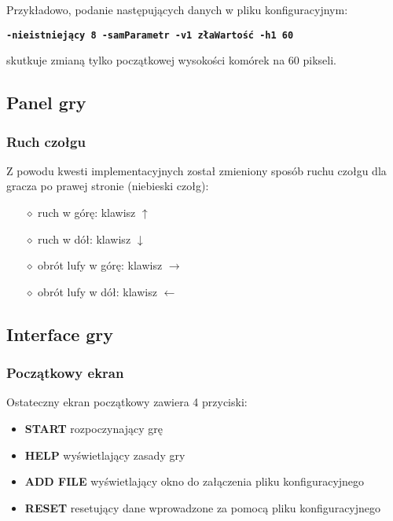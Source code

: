 \documentclass[a4paper]{article}
\begin{document}
Przyk\l{}adowo, podanie nast\k{e}puj\k{a}cych danych w pliku konfiguracyjnym:

\begin{center}
\texttt{\textbf{-nieistniej\k{a}cy 8 -samParametr -v1 z\l{}aWarto\'s\'c -h1 60}}    
\end{center}

skutkuje zmian\k{a} tylko pocz\k{a}tkowej wysoko\'sci kom\'orek na 60 pikseli.

\subsection{Panel gry}
\subsubsection{Ruch czo\l{}gu}
\quad Z powodu kwesti implementacyjnych zosta\l{} zmieniony spos\'ob ruchu czo\l{}gu dla gracza po prawej stronie (niebieski czo\l{}g):
\begin{itemize}
    \item[$\diamond$] ruch w g\'or\k{e}: klawisz \textbf{$\uparrow$}
    \item[$\diamond$] ruch w d\'o\l{}: klawisz \textbf{$\downarrow$}
    \item[$\diamond$] obr\'ot lufy w g\'or\k{e}: klawisz \textbf{$\rightarrow$}
    \item[$\diamond$] obr\'ot lufy w d\'o\l{}: klawisz \textbf{$\leftarrow$}
\end{itemize}

\subsection{Interface gry}
\subsubsection{Pocz\k{a}tkowy ekran}
\quad Ostateczny ekran pocz\k{a}tkowy zawiera 4 przyciski: 
\begin{itemize}
    \item \textbf{START} rozpoczynaj\k{a}cy gr\k{e}
    \item \textbf{HELP} wy\'swietlaj\k{a}cy zasady gry
    \item \textbf{ADD FILE} wy\'swietlaj\k{a}cy okno do za\l{}\k{a}czenia pliku konfiguracyjnego
    \item \textbf{RESET} resetuj\k{a}cy dane wprowadzone za pomoc\k{a} pliku konfiguracyjnego
\end{itemize}
\end{document}
